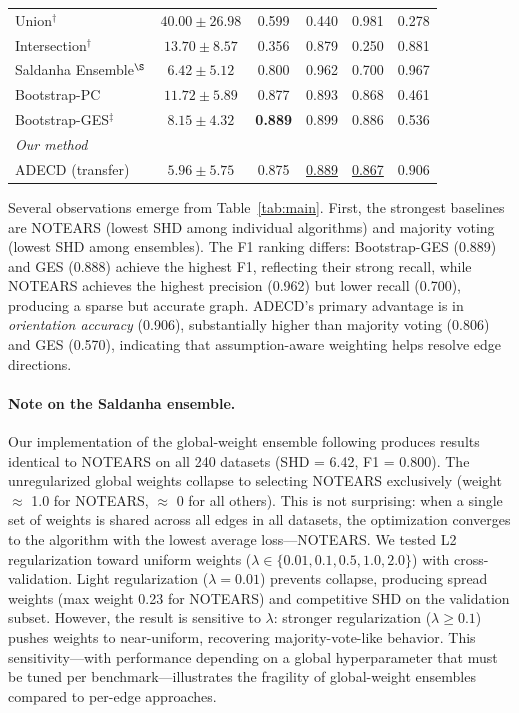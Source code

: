 \documentclass{article}
\newcommand{\adecd}{\textsc{ADECD}}
\begin{document}
\begin{table}[t]
\begin{tabular}{lccccc}
Union$^\dagger$ & $40.00 \pm 26.98$ & 0.599 & 0.440 & 0.981 & 0.278 \\
Intersection$^\dagger$ & $13.70 \pm 8.57$ & 0.356 & 0.879 & 0.250 & 0.881 \\
Saldanha Ensemble$^\S$ & $6.42 \pm 5.12$ & 0.800 & 0.962 & 0.700 & 0.967 \\
Bootstrap-PC & $11.72 \pm 5.89$ & 0.877 & 0.893 & 0.868 & 0.461 \\
Bootstrap-GES$^\ddagger$ & $8.15 \pm 4.32$ & \textbf{0.889} & 0.899 & 0.886 & 0.536 \\
\midrule
\multicolumn{6}{l}{\emph{Our method}} \\
\adecd{} (transfer) & $\mathbf{5.96 \pm 5.75}$ & 0.875 & \underline{0.889} & \underline{0.867} & $\mathbf{0.906}$ \\
\bottomrule
\end{tabular}
\end{table}

Several observations emerge from Table~\ref{tab:main}.
First, the strongest baselines are NOTEARS (lowest SHD among individual algorithms) and majority voting (lowest SHD among ensembles).
The F1 ranking differs: Bootstrap-GES (0.889) and GES (0.888) achieve the highest F1, reflecting their strong recall, while NOTEARS achieves the highest precision (0.962) but lower recall (0.700), producing a sparse but accurate graph.
\adecd{}'s primary advantage is in \emph{orientation accuracy} (0.906), substantially higher than majority voting (0.806) and GES (0.570), indicating that assumption-aware weighting helps resolve edge directions.

\paragraph{Note on the Saldanha ensemble.}
Our implementation of the global-weight ensemble following \citet{saldanha2020evaluation} produces results identical to NOTEARS on all 240 datasets (SHD = 6.42, F1 = 0.800).
The unregularized global weights collapse to selecting NOTEARS exclusively (weight $\approx$ 1.0 for NOTEARS, $\approx$ 0 for all others).
This is not surprising: when a single set of weights is shared across all edges in all datasets, the optimization converges to the algorithm with the lowest average loss---NOTEARS.
We tested L2 regularization toward uniform weights ($\lambda \in \{0.01, 0.1, 0.5, 1.0, 2.0\}$) with cross-validation.
Light regularization ($\lambda = 0.01$) prevents collapse, producing spread weights (max weight 0.23 for NOTEARS) and competitive SHD on the validation subset.
However, the result is sensitive to $\lambda$: stronger regularization ($\lambda \geq 0.1$) pushes weights to near-uniform, recovering majority-vote-like behavior.
This sensitivity---with performance depending on a global hyperparameter that must be tuned per benchmark---illustrates the fragility of global-weight ensembles compared to per-edge approaches.
\end{document}
